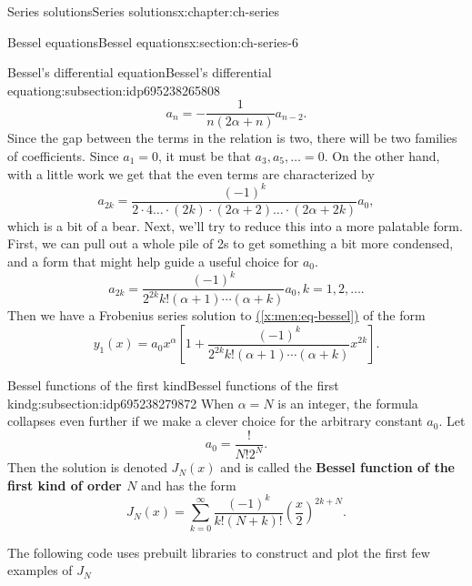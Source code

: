 \documentclass[oneside,10pt,]{book}
\newcommand{\xreffont}{\relax}
\newcommand{\terminology}[1]{\textbf{#1}}
\numberwithin{equation}{section}
\numberwithin{equation}{section}
\begin{document}
\begin{chapterptx}{Series solutions}{}{Series solutions}{}{}{x:chapter:ch-series}
\begin{sectionptx}{Bessel equations}{}{Bessel equations}{}{}{x:section:ch-series-6}
\begin{subsectionptx}{Bessel's differential equation}{}{Bessel's differential equation}{}{}{g:subsection:idp695238265808}
\begin{equation*}
a_n = -\frac{1}{n(2\alpha + n)} a_{n-2}.
\end{equation*}
Since the gap between the terms in the relation is two, there will be two families of coefficients. Since \(a_1 = 0\), it must be that \(a_3, a_5, \ldots = 0\). On the other hand, with a little work we get that the even terms are characterized by%
\begin{equation*}
a_{2k} = \frac{(-1)^k}{2 \cdot 4 \ldots \cdot (2k) \cdot (2\alpha + 2) \ldots \cdot (2 \alpha + 2k)} a_0,
\end{equation*}
which is a bit of a bear. Next, we'll try to reduce this into a more palatable form. First, we can pull out a whole pile of 2s to get something a bit more condensed, and a form that might help guide a useful choice for \(a_0\).%
\begin{equation*}
a_{2k} = \frac{(-1)^k}{2^{2k} k! (\alpha + 1) \cdots (\alpha + k)} a_0, k = 1, 2, \ldots.
\end{equation*}
Then we have a Frobenius series solution to \hyperref[x:men:eq-bessel]{({\xreffont\ref{x:men:eq-bessel}})} of the form%
\begin{equation}
y_1(x) = a_0 x^\alpha \left[1 + \frac{(-1)^k}{2^{2k} k! (\alpha + 1) \cdots (\alpha + k)} x^{2k}\right].\label{x:men:eq-bessel-series}
\end{equation}
%
\end{subsectionptx}
%
%
\typeout{************************************************}
\typeout{************************************************}
%
\begin{subsectionptx}{Bessel functions of the first kind}{}{Bessel functions of the first kind}{}{}{g:subsection:idp695238279872}
When \(\alpha = N\) is an integer, the formula collapses even further if we make a clever choice for the arbitrary constant \(a_0\). Let%
\begin{equation*}
a_0 = \frac{!}{N!2^N}.
\end{equation*}
Then the solution is denoted \(J_N(x)\) and is called the \terminology{Bessel function of the first kind of order \(N\)} and has the form%
\begin{equation*}
J_N(x) = \sum_{k=0}^\infty \frac{(-1)^k}{k!(N + k)!} \left(\frac{x}{2}\right)^{2k + N}.
\end{equation*}
%
\par
The following code uses prebuilt libraries to construct and plot the first few examples of \(J_N\)%

\end{subsectionptx}
\end{sectionptx}
\end{chapterptx}
\end{document}
